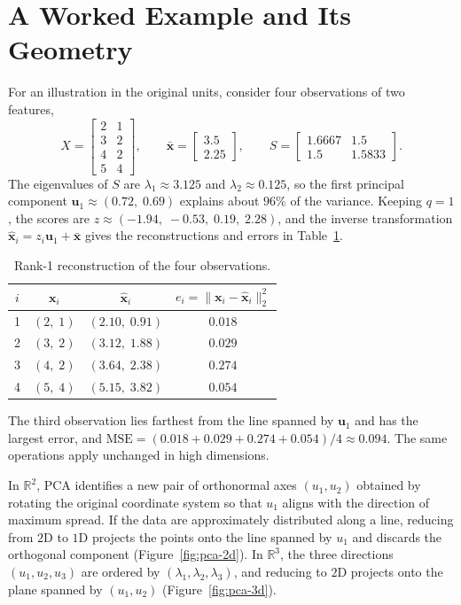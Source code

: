 \documentclass[12pt]{report}
\begin{document}
\section{A Worked Example and Its Geometry}
For an illustration in the original units, consider four observations of two features,
\[
X =
\begin{bmatrix}
2 & 1 \\
3 & 2 \\
4 & 2 \\
5 & 4
\end{bmatrix},
\qquad
\bar{\mathbf{x}} = \begin{bmatrix} 3.5 \\ 2.25 \end{bmatrix},
\qquad
S = \begin{bmatrix} 1.6667 & 1.5 \\ 1.5 & 1.5833 \end{bmatrix}.
\]
The eigenvalues of $S$ are $\lambda_1 \approx 3.125$ and $\lambda_2 \approx 0.125$, so the first
principal component $\mathbf{u}_1 \approx (0.72,\; 0.69)$ explains about $96\%$ of the variance.
Keeping $q = 1$, the scores are $z \approx (-1.94,\; -0.53,\; 0.19,\; 2.28)$, and the inverse
transformation $\widehat{\mathbf{x}}_i = z_i\mathbf{u}_1 + \bar{\mathbf{x}}$ gives the
reconstructions and errors in Table~\ref{tab:pca-example}.

\begin{table}[H]
\centering
\caption{Rank-1 reconstruction of the four observations.}
\label{tab:pca-example}
\begin{tabular}{cccc}
\toprule
$i$ & $\mathbf{x}_i$ & $\widehat{\mathbf{x}}_i$ & $e_i = \|\mathbf{x}_i - \widehat{\mathbf{x}}_i\|_2^2$ \\
\midrule
1 & $(2,\;1)$ & $(2.10,\;0.91)$ & $0.018$ \\
2 & $(3,\;2)$ & $(3.12,\;1.88)$ & $0.029$ \\
3 & $(4,\;2)$ & $(3.64,\;2.38)$ & $0.274$ \\
4 & $(5,\;4)$ & $(5.15,\;3.82)$ & $0.054$ \\
\bottomrule
\end{tabular}
\end{table}

\noindent The third observation lies farthest from the line spanned by $\mathbf{u}_1$ and has the
largest error, and $\mathrm{MSE} = (0.018 + 0.029 + 0.274 + 0.054)/4 \approx 0.094$. The same
operations apply unchanged in high dimensions.


In $\mathbb{R}^2$, PCA identifies a new pair of orthonormal axes $(u_1,u_2)$ obtained by rotating
the original coordinate system so that $u_1$ aligns with the direction of maximum spread. If the
data are approximately distributed along a line, reducing from $2$D to $1$D projects the points
onto the line spanned by $u_1$ and discards the orthogonal component (Figure~\ref{fig:pca-2d}).
In $\mathbb{R}^3$, the three directions $(u_1,u_2,u_3)$ are ordered by $(\lambda_1,\lambda_2,\lambda_3)$,
and reducing to $2$D projects onto the plane spanned by $(u_1,u_2)$ (Figure~\ref{fig:pca-3d}).
\end{document}
